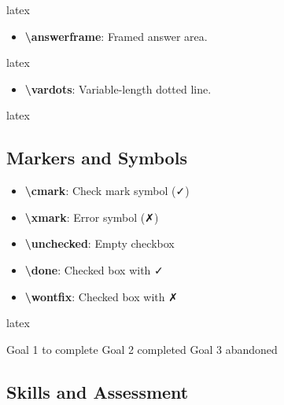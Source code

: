 \documentclass[
    margin=2cm
]{neoschool}
\begin{document}
\begin{code}{latex}

\end{code}

\begin{itemize}
\item
  \textbf{\textbackslash answerframe}: Framed answer area.
\end{itemize}

\begin{code}{latex}

\end{code}

\begin{itemize}
\item
  \textbf{\textbackslash vardots}: Variable-length dotted line.
\end{itemize}

\begin{code}{latex}
\vardots

\vardots[5cm]
\end{code}

\subsection{Markers and Symbols}

\begin{itemize}
\item
  \textbf{\textbackslash cmark}: Check mark symbol (✓)
\item
  \textbf{\textbackslash xmark}: Error symbol (✗)
\item
  \textbf{\textbackslash unchecked}: Empty checkbox
\item
  \textbf{\textbackslash done}: Checked box with ✓
\item
  \textbf{\textbackslash wontfix}: Checked box with ✗
\end{itemize}

\begin{code}{latex}
\begin{itemize}
    \unchecked Goal 1 to complete
    \done      Goal 2 completed
    \wontfix   Goal 3 abandoned
\end{itemize}
\end{code}

\subsection{Skills and Assessment}
\end{document}
